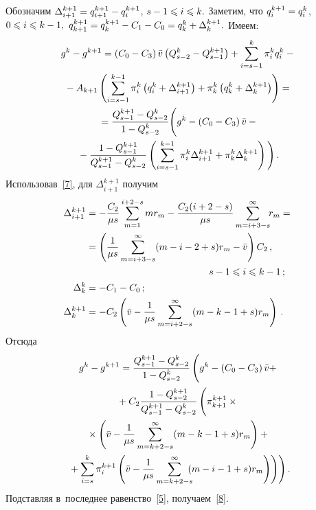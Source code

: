 \begin{multicols}{2}
{Обозначим $\Delta_{i+1}^{k+1}\hm=q_{i+1}^{k+1}\hm-q_{i}^{k+1}$, $s\hm-1\hm\leqslant
i\hm\leqslant k.$ Заметим, что $q_i^{k+1}\hm=q_i^k$, $0\hm\leqslant i\hm\leqslant k\hm-1,$
$q_{k+1}^{k+1}\hm=q_k^{k+1}\hm-C_1\hm-C_0\hm=q_k^{k}\hm+\Delta_k^{k+1}.$ Имеем:
\begin{multline*}
g^k-g^{k+1}=\left(C_0-C_3\right)\bar{v}\left(
Q_{s-2}^k-Q_{s-1}^{k+1}\right)+
\sum\limits_{i=s-1}^k\pi_i^kq_i^k-{}\\
{}- A_{k+1}
\left(\sum\limits_{i=s-1}^{k-1}\pi_i^k\left(q_i^k+\Delta_{i+1}^{k+1}\right)+
\pi_k^k\left(q_k^k+\Delta_k^{k+1}\right)\right)={}\\
{}=
\displaystyle\frac{\displaystyle Q_{s-1}^{k+1}-Q_{s-2}^k\mathstrut}{\displaystyle 1-Q_{s-2}^k\mathstrut}
\Bigg(g^k-\left(C_0-C_3\right)\bar{v}-{}\\
{}-
\displaystyle\frac{\displaystyle 1-Q_{s-1}^{k+1}\mathstrut}{\displaystyle Q_{s-1}^{k+1}-Q_{s-2}^k\mathstrut}
\left(\sum\limits_{i=s-1}^{k-1}\pi_i^k\Delta_{i+1}^{k+1}+
\pi_k^k\Delta_k^{k+1}\right)\Bigg)\,.
\end{multline*}
Использовав~\eqref{7}, для $\Delta_{i+1}^{k+1}$ получим
\begin{align*}
\Delta_{i+1}^{k+1}&=-\fr{C_2}{\mu s}\sum\limits_{m=1}^{i+2-s}mr_m-\fr{C_2(i+2-s)}
{\mu s}\sum\limits_{m=i+3-s}^{\infty}\!\!r_m={}\\
&{}=\left(\fr{1}{\mu s}
\sum\limits_{m=i+3-s}^{\infty}(m-i-2+s)r_m-\bar{v}\right) C_2\,,\\
&\hspace*{45mm} s-1\leqslant i\leqslant k-1\,;
\\
 \Delta_k^k&=-C_1-C_0\,;
 \\
\Delta_k^{k+1}&=-C_2\left(\bar{v}-\fr{1}{\mu s}
\sum\limits_{m=i+2-s}^{\infty}(m-k-1+s)r_m\right)\,.
\end{align*}
Отсюда
\begin{multline*}
g^k-g^{k+1}=\fr{Q_{s-1}^{k+1}-Q_{s-2}^k}{1-Q_{s-2}^k}\left(
\vphantom{\sum\limits_{m=0}^{k+1-s}}
g^k-\left(C_0-C_3\right)
\bar{v}+\right.\\
{}+C_2\fr{1-Q_{s-2}^{k+1}}{Q_{s-1}^{k+1}-Q_{s-2}^k}\left(
\vphantom{\sum\limits_{m=0}^{k+1-s}}
\pi_{k+1}^{k+1}\times{}\right.
\\
\left.{}\times\left(\bar{v}- \fr{1}{\mu
s}\sum\limits_{m=k+2-s}^{\infty}(m-k-1+s)r_m\right)+{}\right.\\
\left.\left.{}+
\sum\limits_{i=s}^k
\pi_i^{k+1}\left(\bar{v}-
\fr{1}{\mu s}\sum\limits_{m=k+2-s}^{\infty}\!\!\!(m-i-1+s)r_m\right)
\right)\right).
\end{multline*}
Подставляя в~последнее равенство~\eqref{5}, получаем~\eqref{8}.

}
\end{multicols}
